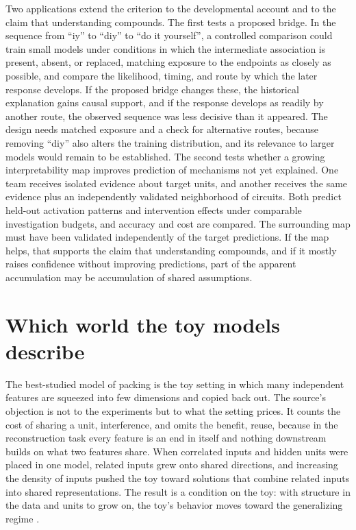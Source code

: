 \documentclass[11pt]{article}
\begin{document}
Two applications extend the criterion to the developmental account and to the claim that understanding compounds. The first tests a proposed bridge. In the sequence from ``iy'' to ``diy'' to ``do it yourself'', a controlled comparison could train small models under conditions in which the intermediate association is present, absent, or replaced, matching exposure to the endpoints as closely as possible, and compare the likelihood, timing, and route by which the later response develops. If the proposed bridge changes these, the historical explanation gains causal support, and if the response develops as readily by another route, the observed sequence was less decisive than it appeared. The design needs matched exposure and a check for alternative routes, because removing ``diy'' also alters the training distribution, and its relevance to larger models would remain to be established. The second tests whether a growing interpretability map improves prediction of mechanisms not yet explained. One team receives isolated evidence about target units, and another receives the same evidence plus an independently validated neighborhood of circuits. Both predict held-out activation patterns and intervention effects under comparable investigation budgets, and accuracy and cost are compared. The surrounding map must have been validated independently of the target predictions. If the map helps, that supports the claim that understanding compounds, and if it mostly raises confidence without improving predictions, part of the apparent accumulation may be accumulation of shared assumptions.

\section{Which world the toy models describe}

The best-studied model of packing is the toy setting in which many independent features are squeezed into few dimensions and copied back out. The source's objection is not to the experiments but to what the setting prices. It counts the cost of sharing a unit, interference, and omits the benefit, reuse, because in the reconstruction task every feature is an end in itself and nothing downstream builds on what two features share. When correlated inputs and hidden units were placed in one model, related inputs grew onto shared directions, and increasing the density of inputs pushed the toy toward solutions that combine related inputs into shared representations. The result is a condition on the toy: with structure in the data and units to grow on, the toy's behavior moves toward the generalizing regime \cite[\emph{Toy Models}]{cammarata}.
\end{document}
